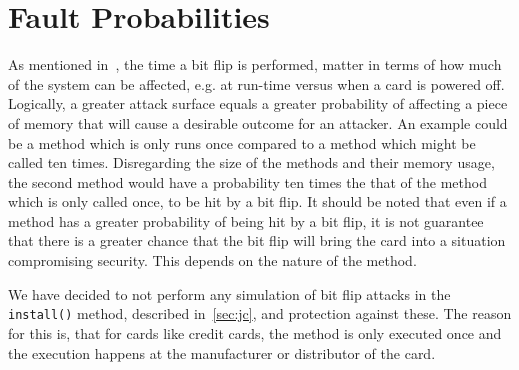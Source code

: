 \section{Fault Probabilities}
As mentioned in~, the time a bit flip is performed, matter in terms of how much of the system can be affected, e.g. at run-time versus when a card is powered off. Logically, a greater attack surface equals a greater probability of affecting a piece of memory that will cause a desirable outcome for an attacker. An example could be a method which is only runs once compared to a method which might be called ten times. Disregarding the size of the methods and their memory usage, the second method would have a probability ten times the that of the method which is only called once, to be hit by a bit flip. It should be noted that even if a method has a greater probability of being hit by a bit flip, it is not guarantee that there is a greater chance that the bit flip will bring the card into a situation compromising security. This depends on the nature of the method.


We have decided to not perform any simulation of bit flip attacks in the \texttt{install()} method, described in~\cref{sec:jc}, and protection against these. The reason for this is, that for cards like credit cards, the method is only executed once and the execution happens at the manufacturer or distributor of the card.

%